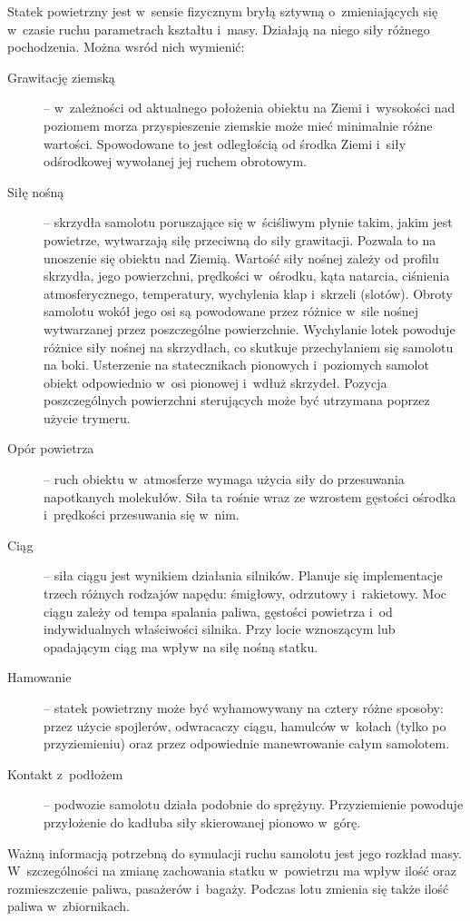 \documentclass{mwrep}
\begin{document}
Statek powietrzny jest w~sensie fizycznym bryłą sztywną o~zmieniających się w~czasie ruchu parametrach kształtu i~masy. Działają na niego siły różnego pochodzenia. Można wsród nich wymienić:
\begin{description}
\item[Grawitację ziemską] -- w~zależności od aktualnego położenia obiektu na Ziemi i~wysokości nad poziomem morza przyspieszenie ziemskie może mieć minimalnie różne wartości. Spowodowane to jest odległością od środka Ziemi i~siły odśrodkowej wywołanej jej ruchem obrotowym.
\item[Siłę nośną] -- skrzydła samolotu poruszające się w~ściśliwym płynie takim, jakim jest powietrze, wytwarzają siłę przeciwną do siły grawitacji. Pozwala to na unoszenie się obiektu nad Ziemią. Wartość siły nośnej zależy od profilu skrzydła, jego powierzchni, prędkości w~ośrodku, kąta natarcia, ciśnienia atmosferycznego, temperatury, wychylenia klap i~skrzeli (slotów). Obroty samolotu wokół jego osi są powodowane przez różnice w~sile nośnej wytwarzanej przez poszczególne powierzchnie. Wychylanie lotek powoduje różnice siły nośnej na skrzydłach, co skutkuje przechylaniem się samolotu na boki. Usterzenie na statecznikach pionowych i~poziomych samolot obiekt odpowiednio w~osi pionowej i~wdłuż skrzydeł. Pozycja poszczególnych powierzchni sterujących może być utrzymana poprzez użycie trymeru.
\item[Opór powietrza] -- ruch obiektu w~atmosferze wymaga użycia siły do przesuwania napotkanych molekułów. Siła ta rośnie wraz ze wzrostem gęstości ośrodka i~prędkości przesuwania się w~nim.
\item[Ciąg] -- siła ciągu jest wynikiem działania silników. Planuje się implementacje trzech różnych rodzajów napędu: śmigłowy, odrzutowy i~rakietowy. Moc ciągu zależy od tempa spalania paliwa, gęstości powietrza i~od indywidualnych właściwości silnika. Przy locie wznoszącym lub opadającym ciąg ma wpływ na siłę nośną statku.
\item[Hamowanie] -- statek powietrzny może być wyhamowywany na cztery różne sposoby: przez użycie spojlerów, odwracaczy ciągu, hamulców w~kołach (tylko po przyziemieniu) oraz przez odpowiednie manewrowanie całym samolotem.
\item[Kontakt z~podłożem] -- podwozie samolotu działa podobnie do sprężyny. Przyziemienie powoduje przyłożenie do kadłuba siły skierowanej pionowo w~górę.
\end{description}

\vspace*{\baselineskip}
Ważną informacją potrzebną do symulacji ruchu samolotu jest jego rozkład masy. W~szczególności na zmianę zachowania statku w~powietrzu ma wpływ ilość oraz rozmieszczenie paliwa, pasażerów i~bagaży. Podczas lotu zmienia się także ilość paliwa w~zbiornikach.
\end{document}

